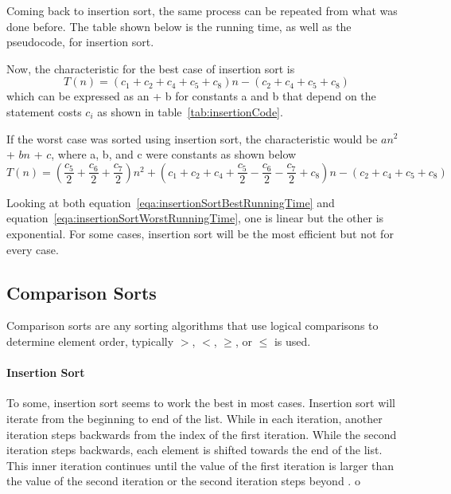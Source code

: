 \documentclass[12pt]{article}
\begin{document}
	Coming back to insertion sort, the same process can be repeated from what was done before.
	The table shown below is the running time, as well as the pseudocode, for insertion sort.
	
	
	
	Now, the characteristic for the best case of insertion sort is
	\begin{equation}
	T(n) = (c_1 + c_2 + c_4 + c_5 + c_8)n - (c_2 + c_4 + c_5 + c_8)
	\label{eqa:insertionSortBestRunningTime}
	\end{equation}
	which can be expressed as an + b for constants a and b that depend on the statement costs $c_i$ as shown in table~\ref{tab:insertionCode}.
	
	If the worst case was sorted using insertion sort, the characteristic would be $an^2$ + $bn$ + $c$, where a, b, and c were constants as shown below
	\begin{equation}
	T(n) = (\frac{c_5}{2} + \frac{c_6}{2} + \frac{c_7}{2})n^2 + (c_1 + c_2 + c_4 + \frac{c_5}{2} - \frac{c_6}{2} - \frac{c_7}{2} + c_8)n - (c_2 + c_4 + c_5 + c_8)
	\label{eqa:insertionSortWorstRunningTime}
	\end{equation}
	
	Looking at both equation~\ref{eqa:insertionSortBestRunningTime} and equation~\ref{eqa:insertionSortWorstRunningTime}, one is linear but the other is exponential.
	For some cases, insertion sort will be the most efficient but not for every case.
	
	\subsection{Comparison Sorts}
	\label{CompSort}
	Comparison sorts are any sorting algorithms that use logical comparisons to determine element order, typically $>$, $<$, $\ge$, or $\le$ is used.
	
	\paragraph{Insertion Sort}
	
	To some, insertion sort seems to work the best in most cases.
	Insertion sort will iterate from the beginning to end of the list.
	While in each iteration, another iteration steps backwards from the index of the first iteration.
	While the second iteration steps backwards, each element is shifted towards the end of the list.
	This inner iteration continues until the value of the first iteration is larger than the value of the second iteration or the second iteration steps beyond .
	o
	
\end{document}
